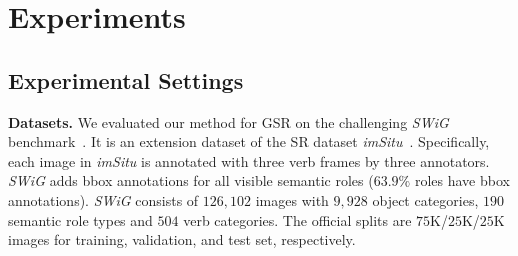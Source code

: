 \documentclass[letterpaper]{article} %
\begin{document}
\addtolength{\tabcolsep}{-3pt}
\addtolength{\abovecaptionskip}{-10pt}
\begin{table}[tb]
    \begin{center}
    \end{center}
    \caption{Performance (\%) of state-of-the-art GSR methods on SWiG dataset test set.}
    \label{tab:tab_performance_test}
\end{table}
\addtolength{\abovecaptionskip}{10pt}
\addtolength{\tabcolsep}{3pt}





\section{Experiments}
\subsection{Experimental Settings}

\noindent \textbf{Datasets.}
We evaluated our method for GSR on the challenging \textit{SWiG} benchmark~\cite{pratt2020grounded}. It is an extension dataset of the SR dataset \textit{imSitu}~\cite{yatskar2016situation}. Specifically, each image in \textit{imSitu} is annotated with three verb frames by three annotators. \textit{SWiG} adds bbox annotations for all visible semantic roles ($63.9\%$ roles have bbox annotations). \textit{SWiG} consists of $126,102$ images with $9,928$ object categories, $190$ semantic role types and $504$ verb categories. The official splits are $75$K/$25$K/$25$K images for training, validation, and test set, respectively.
\end{document}
